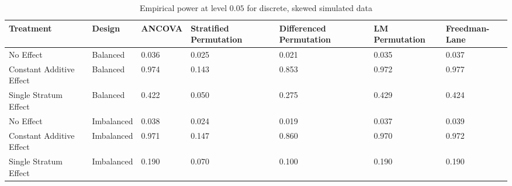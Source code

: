 \begin{table}[ht]
\centering
\begin{tabular}{p{1.25in}|p{0.7in}|p{0.6in}p{0.8in}p{0.8in}p{0.8in}p{0.75in}}
  \hline
Treatment & Design & ANCOVA & Stratified Permutation & Differenced Permutation & LM Permutation & Freedman-Lane \\ 
  \hline
No Effect & Balanced & 0.036 & 0.025 & 0.021 & 0.035 & 0.037 \\ 
  Constant Additive Effect & Balanced & 0.974 & 0.143 & 0.853 & 0.972 & 0.977 \\ 
  Single Stratum Effect & Balanced & 0.422 & 0.050 & 0.275 & 0.429 & 0.424 \\ 
   \hline
No Effect & Imbalanced & 0.038 & 0.024 & 0.019 & 0.037 & 0.039 \\ 
  Constant Additive Effect & Imbalanced & 0.971 & 0.147 & 0.860 & 0.970 & 0.972 \\ 
  Single Stratum Effect & Imbalanced & 0.190 & 0.070 & 0.100 & 0.190 & 0.190 \\ 
   \hline
\end{tabular}
\caption{Empirical power at level $0.05$ for discrete, skewed simulated data} 
\label{tab:skewed_power}
\end{table}
